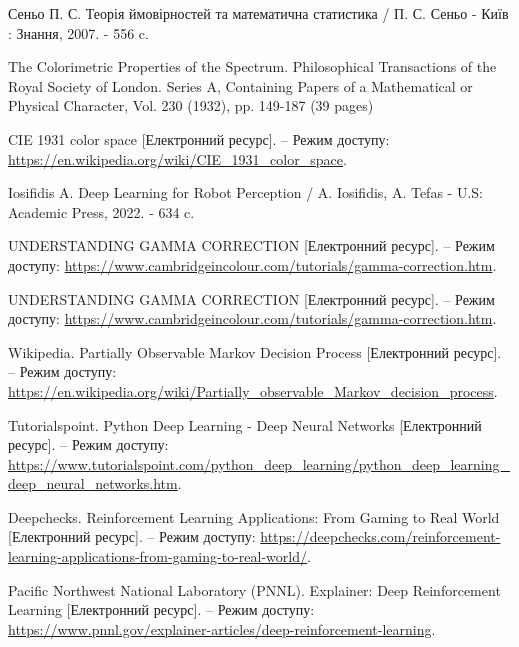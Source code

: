 
 \renewcommand{\bibname}{{Список використаних джерел}}
 \begin{thebibliography}{}
 \setcounter{theorem}{0}

  Сеньо П. С. Теорія ймовірностей та математична статистика / П. С. Сеньо - Київ : Знання, 2007. - 556 c.

  The Colorimetric Properties of the Spectrum. 
  Philosophical Transactions of the Royal Society of London. Series A, Containing Papers of a Mathematical or Physical Character,
  Vol. 230 (1932), pp. 149-187 (39 pages)

    CIE 1931 color space [Електронний ресурс]. – Режим доступу: \url{https://en.wikipedia.org/wiki/CIE_1931_color_space}.

   
  Iosifidis A. Deep Learning for Robot Perception /  A. Iosifidis, A. Tefas - U.S: Academic Press, 2022. - 634 c.
    
    UNDERSTANDING GAMMA CORRECTION [Електронний ресурс]. – Режим доступу: \url{https://www.cambridgeincolour.com/tutorials/gamma-correction.htm}.

    UNDERSTANDING GAMMA CORRECTION [Електронний ресурс]. – Режим доступу: \url{https://www.cambridgeincolour.com/tutorials/gamma-correction.htm}.

    Wikipedia. Partially Observable Markov Decision Process [Електронний ресурс]. – Режим доступу: \url{https://en.wikipedia.org/wiki/Partially_observable_Markov_decision_process}.

    Tutorialspoint. Python Deep Learning - Deep Neural Networks [Електронний ресурс]. – Режим доступу: \url{https://www.tutorialspoint.com/python_deep_learning/python_deep_learning_deep_neural_networks.htm}.

    Deepchecks. Reinforcement Learning Applications: From Gaming to Real World [Електронний ресурс]. – Режим доступу: \url{https://deepchecks.com/reinforcement-learning-applications-from-gaming-to-real-world/}.

    Pacific Northwest National Laboratory (PNNL). Explainer: Deep Reinforcement Learning [Електронний ресурс]. – Режим доступу: \url{https://www.pnnl.gov/explainer-articles/deep-reinforcement-learning}.


\end{thebibliography}

